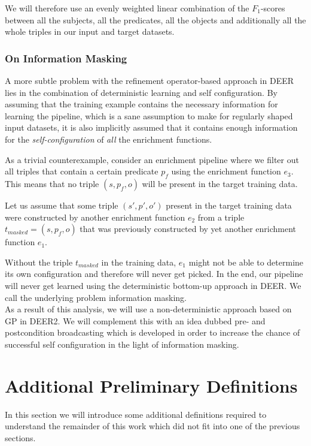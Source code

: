 We will therefore use an evenly weighted linear combination of the $F_1$-scores between all the subjects, all the predicates, all the objects and additionally all the whole triples in our input and target datasets.

\subsubsection*{On Information Masking}

A more subtle problem with the refinement operator-based approach in \ac{DEER} lies in the combination of deterministic learning and self configuration.
By assuming that the training example contains the necessary information for learning the pipeline, which is a sane assumption to make for regularly shaped input datasets, it is also implicitly assumed that it contains enough information for the \emph{self-configuration} of \emph{all} the enrichment functions.

As a trivial counterexample, consider an enrichment pipeline where we filter out all triples that contain a certain predicate $p_f$ using the enrichment function $e_3$.
This means that no triple $(s, p_f, o)$ will be present in the target training data.

Let us assume that some triple $(s', p', o')$ present in the target training data were constructed by another enrichment function $e_2$ from a triple $t_{masked}=(s, p_f, o)$ that was previously constructed by yet another enrichment function $e_1$.

Without the triple $t_{masked}$ in the training data, $e_1$ might not be able to determine its own configuration and therefore will never get picked.
In the end, our pipeline will never get learned using the deterministic bottom-up approach in \ac{DEER}.
We call the underlying problem information masking.\\

As a result of this analysis, we will use a non-deterministic approach based on \ac{GP} in \ac{DEER2}. We will complement this with an idea dubbed pre- and postcondition broadcasting which is developed in order to increase the chance of successful self configuration in the light of information masking.

\section{Additional Preliminary Definitions}

In this section we will introduce some additional definitions required to understand the remainder of this work which did not fit into one of the previous sections.

